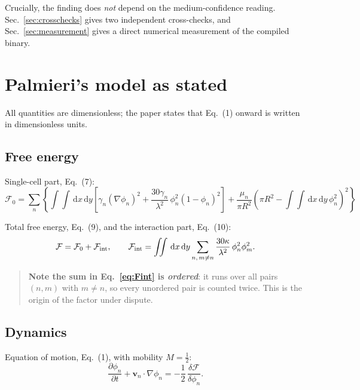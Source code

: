 \documentclass[11pt]{article}
\newcommand{\pn}{\phi_n}
\newcommand{\dd}{\,\mathrm{d}}
\begin{document}
\noindent
Crucially, the finding does \emph{not} depend on the medium-confidence
reading. Sec.~\ref{sec:crosschecks} gives two independent cross-checks, and
Sec.~\ref{sec:measurement} gives a direct numerical measurement of the
compiled binary.

\section{Palmieri's model as stated}

All quantities are dimensionless; the paper states that Eq.~(1) onward is
written in dimensionless units.

\subsection{Free energy}

Single-cell part, Eq.~(7):
\begin{equation}
\mathcal{F}_0 = \sum_n\left\{
  \int\!\!\!\int \dd x\dd y \left[
     \gamma_n(\nabla\pn)^2
   + \frac{30\gamma_n}{\lambda^2}\,\pn^2(1-\pn)^2
  \right]
  + \frac{\mu_n}{\pi R^2}\left(\pi R^2 - \int\!\!\!\int \dd x\dd y\,\pn^2\right)^{\!2}
\right\}
\label{eq:F0}
\end{equation}

Total free energy, Eq.~(9), and the interaction part, Eq.~(10):
\begin{equation}
\mathcal{F} = \mathcal{F}_0 + \mathcal{F}_{\rm int},
\qquad
\mathcal{F}_{\rm int} = \int\!\!\!\int \dd x\dd y
   \sum_{n,\,m\neq n} \frac{30\kappa}{\lambda^2}\,\pn^2\phi_m^2 .
\label{eq:Fint}
\end{equation}

\begin{quote}
\textbf{Note the sum in Eq.~\eqref{eq:Fint} is \emph{ordered}}: it runs over
all pairs $(n,m)$ with $m\neq n$, so every unordered pair is counted twice.
This is the origin of the factor under dispute.
\end{quote}

\subsection{Dynamics}

Equation of motion, Eq.~(1), with mobility $M=\tfrac12$:
\begin{equation}
\frac{\partial\pn}{\partial t} + \mathbf{v}_n\cdot\nabla\pn
  = -\frac{1}{2}\,\frac{\delta\mathcal{F}}{\delta\pn}.
\label{eq:eom}
\end{equation}
\end{document}
